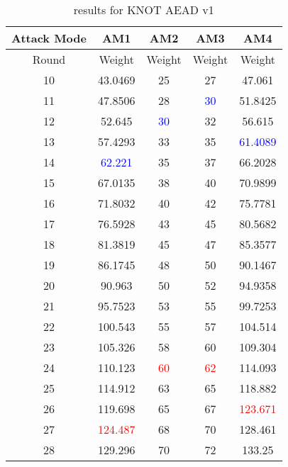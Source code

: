 \begin{table}
	\caption{results for KNOT AEAD v1}\label{tab:knot-aead-v1}
	\centering
	\begin{tabular}{|c|c|c|c|c|}
		\hline
		Attack Mode & AM1 & AM2 & AM3 & AM4\\
		\hline
		Round & Weight & Weight & Weight & Weight\\
		\hline
		10 & 43.0469 & 25 & 27 & 47.061\\
		11 & 47.8506 & 28 & \textcolor{blue}{30} & 51.8425\\
		12 & 52.645 & \textcolor{blue}{30} & 32 & 56.615\\
		13 & 57.4293 & 33 & 35 & \textcolor{blue}{61.4089}\\
		14 & \textcolor{blue}{62.221} & 35 & 37 & 66.2028\\
		15 & 67.0135 & 38 & 40 & 70.9899\\
		16 & 71.8032 & 40 & 42 & 75.7781\\
		17 & 76.5928 & 43 & 45 & 80.5682\\
		18 & 81.3819 & 45 & 47 & 85.3577\\
		19 & 86.1745 & 48 & 50 & 90.1467\\
		20 & 90.963 & 50 & 52 & 94.9358\\
		21 & 95.7523 & 53 & 55 & 99.7253\\
		22 & 100.543 & 55 & 57 & 104.514\\
		23 & 105.326 & 58 & 60 & 109.304\\
		24 & 110.123 & \textcolor{red}{60} & \textcolor{red}{62} & 114.093\\
		25 & 114.912 & 63 & 65 & 118.882\\
		26 & 119.698 & 65 & 67 & \textcolor{red}{123.671}\\
		27 & \textcolor{red}{124.487} & 68 & 70 & 128.461\\
		28 & 129.296 & 70 & 72 & 133.25\\
		\hline
	\end{tabular}
\end{table}

